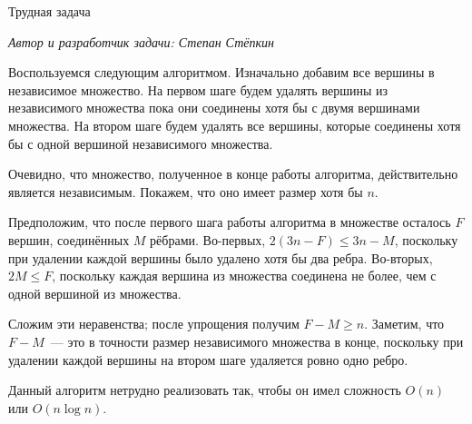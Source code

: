 \begin{tutorial}{Трудная задача}

\textit{Автор и разработчик задачи: Степан Стёпкин}

Воспользуемся следующим алгоритмом. Изначально добавим все вершины в независимое множество. На первом шаге будем удалять вершины из независимого множества пока они соединены хотя бы с двумя вершинами множества. На втором шаге будем удалять все вершины, которые соединены хотя бы с одной вершиной независимого множества.

Очевидно, что множество, полученное в конце работы алгоритма, действительно является независимым. Покажем, что оно имеет размер хотя бы $n$.

Предположим, что после первого шага работы алгоритма в множестве осталось $F$ вершин, соединённых $M$ рёбрами. Во-первых, $2(3n - F) \leq 3n - M$, поскольку при удалении каждой вершины было удалено хотя бы два ребра. Во-вторых, $2M \leq F$, поскольку каждая вершина из множества соединена не более, чем с одной вершиной из множества.

Сложим эти неравенства; после упрощения получим $F - M \geq n$. Заметим, что $F - M$~--- это в точности размер независимого множества в конце, поскольку при удалении каждой вершины на втором шаге удаляется ровно одно ребро.

Данный алгоритм нетрудно реализовать так, чтобы он имел сложность $O(n)$ или $O(n \log n)$.

\end{tutorial}

